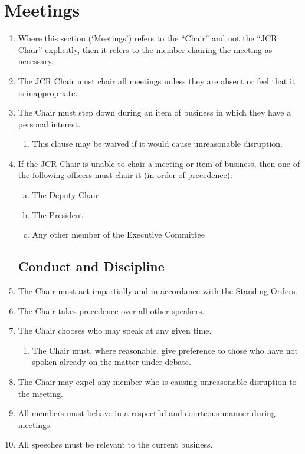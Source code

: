 \documentclass[12pt]{article}
\begin{document}
\section{Meetings}
\begin{enumerate}
    \subsection{The Chair}
    \item Where this section (‘Meetings’) refers to the “Chair” and not the “JCR Chair” explicitly, then it refers to the member chairing the meeting as necessary.
    \item The JCR Chair must chair all meetings unless they are absent or feel that it is inappropriate.
    \item The Chair must step down during an item of business in which they have a personal interest.
    \begin{enumerate}
        \item This clause may be waived if it would cause unreasonable disruption.
    \end{enumerate}
    \item If the JCR Chair is unable to chair a meeting or item of business, then one of the following officers must chair it (in order of precedence):
    \begin{enumerate}[(a)]
        \item The Deputy Chair
        \item The President
        \item Any other member of the Executive Committee
    \end{enumerate}
    \subsection{Conduct and Discipline}
    \item The Chair must act impartially and in accordance with the Standing Orders.
    \item The Chair takes precedence over all other speakers.
    \item The Chair chooses who may speak at any given time.
    \begin{enumerate}
        \item The Chair must, where reasonable, give preference to those who have not spoken already on the matter under debate.
    \end{enumerate}
    \item The Chair may expel any member who is causing unreasonable disruption to the meeting.
    \item All members must behave in a respectful and courteous manner during meetings.
    \item All speeches must be relevant to the current business.

\end{enumerate}
\end{document}

